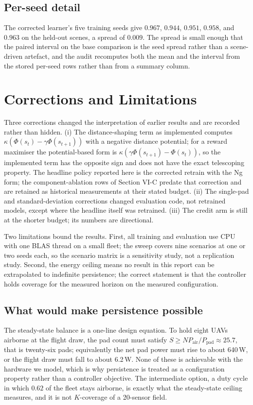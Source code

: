 \documentclass[conference]{IEEEtran}
\begin{document}
\subsection{Per-seed detail}
The corrected learner's five training seeds give $0.967$, $0.944$, $0.951$, $0.958$, and $0.963$ on the held-out scenes, a spread of $0.009$. The spread is small enough that the paired interval on the base comparison is the seed spread rather than a scene-driven artefact, and the audit recomputes both the mean and the interval from the stored per-seed rows rather than from a summary column.


\section{Corrections and Limitations}
Three corrections changed the interpretation of earlier results and are recorded rather than hidden. (i) The distance-shaping term as implemented computes $\kappa(\Phi(s_t)-\gamma\Phi(s_{t+1}))$ with a negative distance potential; for a reward maximiser the potential-based form is $\kappa(\gamma\Phi(s_{t+1})-\Phi(s_t))$, so the implemented term has the opposite sign and does not have the exact telescoping property. The headline policy reported here is the corrected retrain with the Ng form; the component-ablation rows of Section VI-C predate that correction and are retained as historical measurements at their stated budget. (ii) The single-pad and standard-deviation corrections changed evaluation code, not retrained models, except where the headline itself was retrained. (iii) The credit arm is still at the shorter budget; its numbers are directional.

Two limitations bound the results. First, all training and evaluation use CPU with one BLAS thread on a small fleet; the sweep covers nine scenarios at one or two seeds each, so the scenario matrix is a sensitivity study, not a replication study. Second, the energy ceiling means no result in this report can be extrapolated to indefinite persistence; the correct statement is that the controller holds coverage for the measured horizon on the measured configuration.

\subsection{What would make persistence possible}
The steady-state balance is a one-line design equation. To hold eight UAVs airborne at the flight draw, the pad count must satisfy $S\ge NP_{\mathrm{air}}/P_{\mathrm{pad}}\approx25.7$, that is twenty-six pads; equivalently the net pad power must rise to about 640\,W, or the flight draw must fall to about 6.2\,W. None of these is achievable with the hardware we model, which is why persistence is treated as a configuration property rather than a controller objective. The intermediate option, a duty cycle in which $0.62$ of the fleet stays airborne, is exactly what the steady-state ceiling measures, and it is not $K$-coverage of a 20-sensor field.
\end{document}
